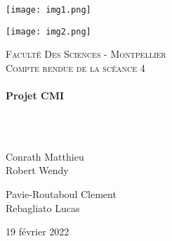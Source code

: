 \documentclass[a4paper, 12pt]{article}
\begin{document}
\begin{titlepage}
  \begin{sffamily}
  \begin{center}
  

\begin{minipage}[c]{.46\linewidth}
     \begin{center}
             \texttt{[image: img1.png]}
         \end{center}
   \end{minipage} \hfill
   \begin{minipage}[c]{.46\linewidth}
    \begin{center}
            \texttt{[image: img2.png]}
        \end{center}
 \end{minipage}
    \newline \newline

    \textsc{\LARGE Faculté Des Sciences - Montpellier}\\[2cm]

    \textsc{\Large Compte rendue de la scéance 4}\\[1.5cm]

    \HRule \\[0.4cm]
    { \huge \bfseries Projet CMI\\[0.4cm] }

    \HRule \\[2cm]
    \\[2cm]

    \begin{minipage}{0.4\textwidth}
      \begin{flushleft} \large
        Conrath Matthieu\\
        Robert Wendy\\
      \end{flushleft}
    \end{minipage}
    \begin{minipage}{0.4\textwidth}
      \begin{flushright} \large
       Pavie-Routaboul Clement\\
        Rebagliato Lucas\\
      \end{flushright}
    \end{minipage}

    \vfill

    {\large 19 février 2022}

  \end{center}
  \end{sffamily}
\end{titlepage}
\end{document}
